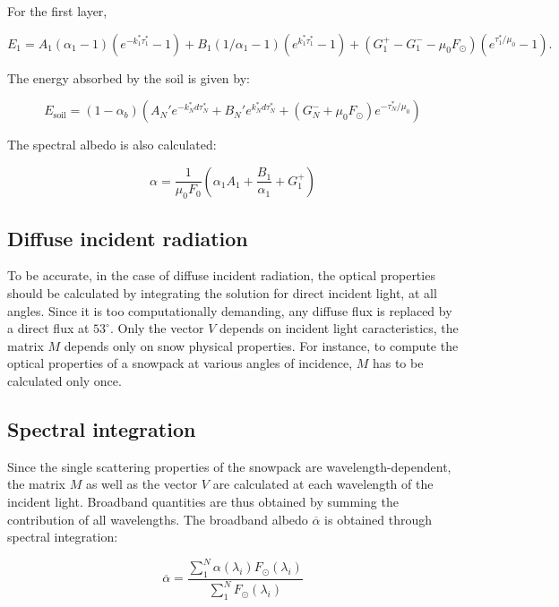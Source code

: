 \documentclass[a4paper,11pt]{article}
\begin{document}
For the first layer,

\begin{equation}
E_1=A_1(\alpha_1-1)(e^{-k_1^*\tau_{1}^*}-1)+B_1(1/\alpha_1-1)(e^{k_1^*\tau_{1}^*}-1)+(G_1^+-G_1^- - \mu_0 F_\odot)(e^{\tau_{1}^*/\mu_0}-1). 
\end{equation}

The energy absorbed by the soil is given by:

\begin{equation}
E_{\textrm{soil}}=(1-\alpha_b)(A_N'e^{-k_N^*d\tau_{N}^*}+B_N'e^{k_N^*d\tau_{N}^*} + (G_N^{-} + \mu_0 F_\odot)e^{-\tau^*_N/\mu_0})
\end{equation}

The spectral albedo is also calculated:

\begin{equation}
\alpha=\dfrac{1}{\mu_0 F_0}\left(\alpha_1 A_1+\dfrac{B_1}{\alpha_1}+G^+_1\right)
\end{equation}

\subsection{Diffuse incident radiation}

To be accurate, in the case of diffuse incident radiation, the optical properties should be calculated by integrating the solution for direct incident light, at all angles. Since it is too computationally demanding, any diffuse flux is replaced by a direct flux at $53^\circ$. Only the vector $V$ depends on incident light caracteristics, the matrix $M$ depends only on snow physical properties. For instance, to compute the optical properties of a snowpack at various angles of incidence, $M$ has to be calculated only once.

\subsection{Spectral integration}
Since the single scattering properties of the snowpack are wavelength-dependent, the matrix $M$ as well as the vector $V$ are calculated at each wavelength of the incident light. Broadband quantities are thus obtained by summing the contribution of all wavelengths. The broadband albedo $\overline{\alpha}$ is obtained through spectral integration:

\begin{equation}
\overline{\alpha}=\dfrac{\displaystyle\sum\limits_{1}^{N}\alpha(\lambda_i)F_\odot(\lambda_i)}{\displaystyle\sum\limits_{1}^{N}F_\odot(\lambda_i)}
\end{equation}
\end{document}
